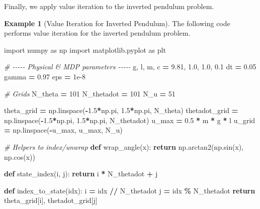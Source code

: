 \documentclass[
]{book}
\newenvironment{Shaded}{\begin{snugshade}}{\end{snugshade}}
\newcommand{\CommentTok}[1]{\textcolor[rgb]{0.56,0.35,0.01}{\textit{#1}}}
\newcommand{\ControlFlowTok}[1]{\textcolor[rgb]{0.13,0.29,0.53}{\textbf{#1}}}
\newcommand{\DecValTok}[1]{\textcolor[rgb]{0.00,0.00,0.81}{#1}}
\newcommand{\FloatTok}[1]{\textcolor[rgb]{0.00,0.00,0.81}{#1}}
\newcommand{\ImportTok}[1]{#1}
\newcommand{\KeywordTok}[1]{\textcolor[rgb]{0.13,0.29,0.53}{\textbf{#1}}}
\newcommand{\NormalTok}[1]{#1}
\newcommand{\OperatorTok}[1]{\textcolor[rgb]{0.81,0.36,0.00}{\textbf{#1}}}
\theoremstyle{definition}
\theoremstyle{definition}
\newtheorem{example}{Example}[chapter]
\theoremstyle{definition}
\theoremstyle{definition}
\theoremstyle{remark}
\begin{document}
Finally, we apply value iteration to the inverted pendulum problem.

\begin{example}[Value Iteration for Inverted Pendulum]
\protect\hypertarget{exm:InvertedPendulumValueIteration}{}\label{exm:InvertedPendulumValueIteration}The following code performs value iteration for the inverted pendulum problem.

\begin{Shaded}
\begin{Highlighting}[]
\ImportTok{import}\NormalTok{ numpy }\ImportTok{as}\NormalTok{ np}
\ImportTok{import}\NormalTok{ matplotlib.pyplot }\ImportTok{as}\NormalTok{ plt}

\CommentTok{\# {-}{-}{-}{-}{-} Physical \& MDP parameters {-}{-}{-}{-}{-}}
\NormalTok{g, l, m, c }\OperatorTok{=} \FloatTok{9.81}\NormalTok{, }\FloatTok{1.0}\NormalTok{, }\FloatTok{1.0}\NormalTok{, }\FloatTok{0.1}
\NormalTok{dt }\OperatorTok{=} \FloatTok{0.05}
\NormalTok{gamma }\OperatorTok{=} \FloatTok{0.97}
\NormalTok{eps }\OperatorTok{=} \FloatTok{1e{-}8}

\CommentTok{\# Grids}
\NormalTok{N\_theta }\OperatorTok{=} \DecValTok{101}
\NormalTok{N\_thetadot }\OperatorTok{=} \DecValTok{101}
\NormalTok{N\_u }\OperatorTok{=} \DecValTok{51}

\NormalTok{theta\_grid }\OperatorTok{=}\NormalTok{ np.linspace(}\OperatorTok{{-}}\FloatTok{1.5}\OperatorTok{*}\NormalTok{np.pi, }\FloatTok{1.5}\OperatorTok{*}\NormalTok{np.pi, N\_theta)}
\NormalTok{thetadot\_grid }\OperatorTok{=}\NormalTok{ np.linspace(}\OperatorTok{{-}}\FloatTok{1.5}\OperatorTok{*}\NormalTok{np.pi, }\FloatTok{1.5}\OperatorTok{*}\NormalTok{np.pi, N\_thetadot)}
\NormalTok{u\_max }\OperatorTok{=} \FloatTok{0.5} \OperatorTok{*}\NormalTok{ m }\OperatorTok{*}\NormalTok{ g }\OperatorTok{*}\NormalTok{ l}
\NormalTok{u\_grid }\OperatorTok{=}\NormalTok{ np.linspace(}\OperatorTok{{-}}\NormalTok{u\_max, u\_max, N\_u)}

\CommentTok{\# Helpers to index/unwrap}
\KeywordTok{def}\NormalTok{ wrap\_angle(x):}
    \ControlFlowTok{return}\NormalTok{ np.arctan2(np.sin(x), np.cos(x))}

\KeywordTok{def}\NormalTok{ state\_index(i, j):}
    \ControlFlowTok{return}\NormalTok{ i }\OperatorTok{*}\NormalTok{ N\_thetadot }\OperatorTok{+}\NormalTok{ j}

\KeywordTok{def}\NormalTok{ index\_to\_state(idx):}
\NormalTok{    i }\OperatorTok{=}\NormalTok{ idx }\OperatorTok{//}\NormalTok{ N\_thetadot}
\NormalTok{    j }\OperatorTok{=}\NormalTok{ idx }\OperatorTok{\%}\NormalTok{ N\_thetadot}
    \ControlFlowTok{return}\NormalTok{ theta\_grid[i], thetadot\_grid[j]}


\end{Highlighting}
\end{Shaded}
\end{example}
\end{document}
